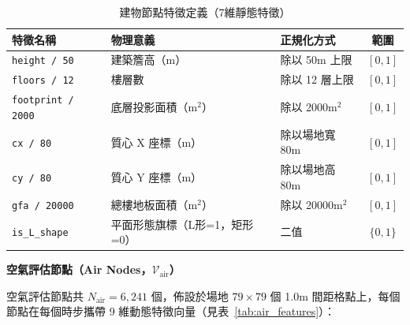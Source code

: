 \begin{table}[htbp]
    \centering
    \caption{建物節點特徵定義（7維靜態特徵）}
    \label{tab:obj_features}
    \small
    \begin{tabular}{lllc}
        \toprule
        \textbf{特徵名稱} & \textbf{物理意義} & \textbf{正規化方式} & \textbf{範圍} \\
        \midrule
        \texttt{height / 50}        & 建築簷高（m）                  & 除以 50m 上限     & $[0, 1]$ \\
        \texttt{floors / 12}        & 樓層數                        & 除以 12 層上限    & $[0, 1]$ \\
        \texttt{footprint / 2000}   & 底層投影面積（m$^2$）           & 除以 2000m$^2$    & $[0, 1]$ \\
        \texttt{cx / 80}            & 質心 X 座標（m）               & 除以場地寬 80m    & $[0, 1]$ \\
        \texttt{cy / 80}            & 質心 Y 座標（m）               & 除以場地高 80m    & $[0, 1]$ \\
        \texttt{gfa / 20000}        & 總樓地板面積（m$^2$）           & 除以 20000m$^2$   & $[0, 1]$ \\
        \texttt{is\_L\_shape}       & 平面形態旗標（L形=1，矩形=0）  & 二值              & $\{0, 1\}$ \\
        \bottomrule
    \end{tabular}
\end{table}

\noindent\textbf{空氣評估節點（Air Nodes，$\mathcal{V}_{\text{air}}$）}

空氣評估節點共 $N_{\text{air}} = 6{,}241$ 個，佈設於場地 $79 \times 79$ 個 1.0m 間距格點上，每個節點在每個時步攜帶 9 維動態特徵向量（見表~\ref{tab:air_features}）：

